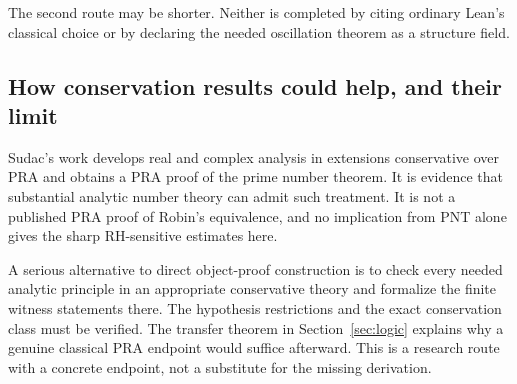 The second route may be shorter. Neither is completed by citing
ordinary Lean's classical choice or by declaring the needed
oscillation theorem as a structure field.

\subsection{How conservation results could help, and their limit}

Sudac's work \cite{Sudac} develops real and complex analysis in
extensions conservative over PRA and obtains a PRA proof of the
prime number theorem. It is evidence that substantial analytic
number theory can admit such treatment. It is not a published
PRA proof of Robin's equivalence, and no implication from PNT
alone gives the sharp RH-sensitive estimates here.

A serious alternative to direct object-proof construction is to
check every needed analytic principle in an appropriate conservative
theory and formalize the finite witness statements there.
The hypothesis restrictions and the exact conservation class must
be verified. The transfer theorem in Section~\ref{sec:logic}
explains why a genuine classical PRA endpoint would suffice
afterward. This is a research route with a concrete endpoint,
not a substitute for the missing derivation.
